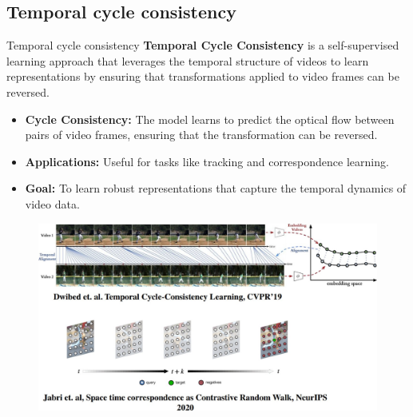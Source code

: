 \subsection{Temporal cycle consistency}
\begin{frame}[allowframebreaks]{Temporal cycle consistency}
    \textbf{Temporal Cycle Consistency} is a self-supervised learning approach that leverages the temporal structure of videos to learn representations by ensuring that transformations applied to video frames can be reversed.

    \begin{itemize}
        \item \textbf{Cycle Consistency:} The model learns to predict the optical flow between pairs of video frames, ensuring that the transformation can be reversed.
        \item \textbf{Applications:} Useful for tasks like tracking and correspondence learning.
        \item \textbf{Goal:} To learn robust representations that capture the temporal dynamics of video data.
    \end{itemize}
\framebreak
    \begin{figure}
        \centering
        \includegraphics[width=1\textwidth,height=0.9\textheight,keepaspectratio]{images/video/slide_48_1_img.jpg}
    \end{figure}
\end{frame}